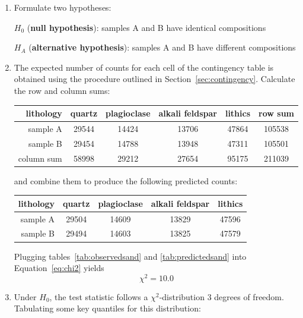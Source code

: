 \begin{enumerate}
\item  Formulate two hypotheses:

  $H_0$ (\textbf{null hypothesis}):
  samples A and B have identical compositions

  $H_{\!A}$ (\textbf{alternative hypothesis}):
  samples A and B have different compositions
  
\item The expected number of counts for each cell of the contingency
  table is obtained using the procedure outlined in
  Section~\ref{sec:contingency}. Calculate the row and column sums:

  \begin{center}
    \begin{tabular}{r|cccc|c}
      lithology & quartz & plagioclase & alkali feldspar &
      lithics & row sum \\ \hline
      sample A & 29544 & 14424 & 13706 & 47864 & 105538 \\
      sample B & 29454 & 14788 & 13948 & 47311 & 105501 \\ \hline
      column sum & 58998 & 29212 & 27654 & 95175 & 211039
    \end{tabular}
  \end{center}

  \noindent and combine them to produce the following predicted
  counts:

  \begin{center}
    \begin{tabular}{r|cccc}
      lithology & quartz & plagioclase & alkali feldspar & lithics  \\ \hline
      sample A & 29504 & 14609 & 13829 & 47596 \\
      sample B & 29494 & 14603 & 13825 & 47579 \\
    \end{tabular}
    \label{tab:predictedsand}
  \end{center}

  Plugging tables~\ref{tab:observedsand} and \ref{tab:predictedsand}
  into Equation~\ref{eq:chi2} yields
  \[
  \chi^2 = 10.0
  \]

\item Under $H_0$, the test statistic follows a
  $\chi^2$-distribution 3 degrees of freedom. Tabulating some key
  quantiles for this distribution:


\end{enumerate}
